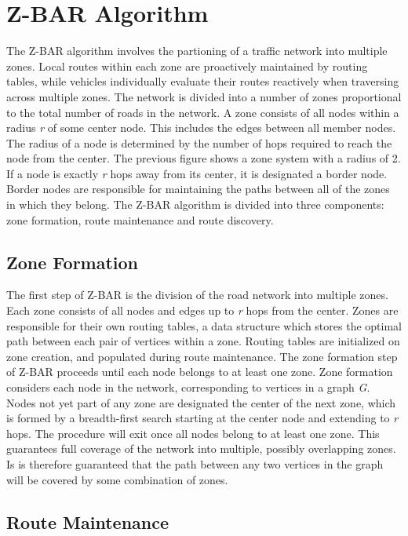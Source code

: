 \documentclass[conference]{IEEEtran}
\begin{document}
\section{Z-BAR Algorithm} %
The Z-BAR algorithm involves the partioning of a traffic network into multiple zones. Local routes within each zone are proactively maintained by routing tables, while vehicles individually evaluate their routes reactively when traversing across multiple zones. The network is divided into a number of zones proportional to the total number of roads in the network. A zone consists of all nodes within a radius \textit{r} of some center node. This includes the edges between all member nodes. The radius of a node is determined by the number of hops required to reach the node from the center. The previous figure shows a zone system with a radius of 2. If a node is exactly \textit{r} hops away from its center, it is designated a border node. Border nodes are responsible for maintaining the paths between all of the zones in which they belong. The Z-BAR algorithm is divided into three components: zone formation, route maintenance and route discovery.

\subsection{Zone Formation}

The first step of Z-BAR is the division of the road network into multiple zones. Each zone consists of all nodes and edges up to \textit{r} hops from the center. Zones are responsible for their own routing tables, a data structure which stores the optimal path between each pair of vertices within a zone. Routing tables are initialized on zone creation, and populated during route maintenance. The zone formation step of Z-BAR proceeds until each node belongs to at least one zone. Zone formation considers each node in the network, corresponding to vertices in a graph \textit{G}. Nodes not yet part of any zone are designated the center of the next zone, which is formed by a breadth-first search starting at the center node and extending to \textit{r} hops. The procedure will exit once all nodes belong to at least one zone. This guarantees full coverage of the network into multiple, possibly overlapping zones. Is is therefore guaranteed that the path between any two vertices in the graph will be covered by some combination of zones.

\subsection{Route Maintenance}
\end{document}
